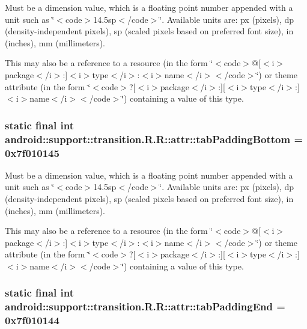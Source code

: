 Must be a dimension value, which is a floating point number appended with a unit such as \char`\"{}$<$code$>$14.5sp$<$/code$>$\char`\"{}. Available units are: px (pixels), dp (density-independent pixels), sp (scaled pixels based on preferred font size), in (inches), mm (millimeters). 

This may also be a reference to a resource (in the form \char`\"{}$<$code$>$@\mbox{[}$<$i$>$package$<$/i$>$:\mbox{]}$<$i$>$type$<$/i$>$:$<$i$>$name$<$/i$>$$<$/code$>$\char`\"{}) or theme attribute (in the form \char`\"{}$<$code$>$?\mbox{[}$<$i$>$package$<$/i$>$:\mbox{]}\mbox{[}$<$i$>$type$<$/i$>$:\mbox{]}$<$i$>$name$<$/i$>$$<$/code$>$\char`\"{}) containing a value of this type. \hypertarget{classandroid_1_1support_1_1transition_1_1_r_1_1attr_eddd929b178944e015bdb8e687ebe225}{
\subsubsection[{tabPaddingBottom}]{\setlength{\rightskip}{0pt plus 5cm}static final int android::support::transition.R.R::attr::tabPaddingBottom = 0x7f010145}}
\label{classandroid_1_1support_1_1transition_1_1_r_1_1attr_eddd929b178944e015bdb8e687ebe225}


Must be a dimension value, which is a floating point number appended with a unit such as \char`\"{}$<$code$>$14.5sp$<$/code$>$\char`\"{}. Available units are: px (pixels), dp (density-independent pixels), sp (scaled pixels based on preferred font size), in (inches), mm (millimeters). 

This may also be a reference to a resource (in the form \char`\"{}$<$code$>$@\mbox{[}$<$i$>$package$<$/i$>$:\mbox{]}$<$i$>$type$<$/i$>$:$<$i$>$name$<$/i$>$$<$/code$>$\char`\"{}) or theme attribute (in the form \char`\"{}$<$code$>$?\mbox{[}$<$i$>$package$<$/i$>$:\mbox{]}\mbox{[}$<$i$>$type$<$/i$>$:\mbox{]}$<$i$>$name$<$/i$>$$<$/code$>$\char`\"{}) containing a value of this type. \hypertarget{classandroid_1_1support_1_1transition_1_1_r_1_1attr_dfed326980a512e2d1a0b8cfb3587119}{
\subsubsection[{tabPaddingEnd}]{\setlength{\rightskip}{0pt plus 5cm}static final int android::support::transition.R.R::attr::tabPaddingEnd = 0x7f010144}}
\label{classandroid_1_1support_1_1transition_1_1_r_1_1attr_dfed326980a512e2d1a0b8cfb3587119}


